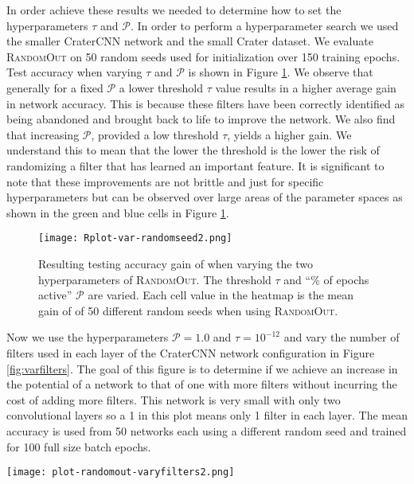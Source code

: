 \documentclass{article}
\begin{document}
In order achieve these results we needed to determine how to set the hyperparameters $\tau$ and $\mathcal{P}$. In order to perform a hyperparameter search we used the smaller CraterCNN network and the small Crater dataset. We evaluate \textsc{RandomOut} on 50 random seeds used for initialization over 150 training epochs. Test accuracy when varying $\tau$ and $\mathcal{P}$ is shown in Figure \ref{fig:var}. We observe that generally for a fixed $\mathcal{P}$ a lower threshold $\tau$ value results in a higher average gain in network accuracy. This is because these filters have been correctly identified as being abandoned and brought back to life to improve the network. We also find that increasing $\mathcal{P}$, provided a low threshold $\tau$, yields a higher gain. We understand this to mean that the lower the threshold is the lower the risk of randomizing a filter that has learned an important feature. It is significant to note that these improvements are not brittle and just for specific hyperparameters but can be observed over large areas of the parameter spaces as shown in the green and blue cells in Figure \ref{fig:var}.


\begin{figure}
    \centering
    \texttt{[image: Rplot-var-randomseed2.png]}
    \caption{Resulting testing accuracy gain of when varying the two hyperparameters of \textsc{RandomOut}. The threshold $\tau$ and ``\%
     of epochs active'' $\mathcal{P}$ are varied. Each cell value in the heatmap is the mean gain of of 50 different random seeds when using \textsc{RandomOut}.}
    \label{fig:var}
\end{figure}


Now we use the hyperparameters $\mathcal{P} = 1.0$ and $\tau = 10^{-12}$ and vary the number of filters used in each layer of the CraterCNN network configuration in Figure \ref{fig:varfilters}. The goal of this figure is to determine if we achieve an increase in the potential of a network to that of one with more filters without incurring the cost of adding more filters. This network is very small with only two convolutional layers so a 1 in this plot means only 1 filter in each layer. The mean accuracy is used from 50 networks each using a different random seed and trained for 100 full size batch epochs. 

\begin{figure*}
    \centering
    \texttt{[image: plot-randomout-varyfilters2.png]}
    \caption{Here the number of filters used in the network is varied between 1 to 10 with and without \textsc{RandomOut} enabled. This plot shows the mean accuracy score from 50 different random seeds of CNNs with \textsc{RandomOut} lead those without it by around 1 to 2 filters consistently. This means the \textsc{RandomOut} method enables CNNs to increase their accuracy to that of a network containing more filters but without the computational cost of actually adding more filters.}
    \label{fig:varfilters}
\end{figure*}
\end{document}
